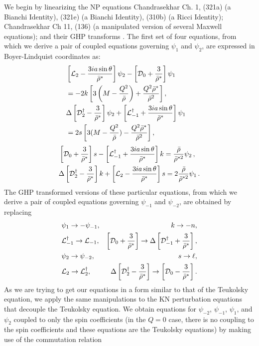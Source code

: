 \begin{refsection}
We begin by linearizing the NP equations Chandrasekhar Ch. 1, (321a) (a Bianchi Identity), (321e) (a Bianchi Identity),  (310b) (a Ricci Identity); Chandrasekhar Ch 11, (136) (a manipulated version of several Maxwell equations); and their GHP transforms \cite{GHP}. The first set of four equations, from which we derive a pair of coupled equations governing $\psi_1$ and $\psi_2$, are expressed in Boyer-Lindquist coordinates as:
\begin{align}
&\left[\mathcal{L}_2-\frac{3ia\sin\theta}{\bar{\rho}^*} \right]\psi_2 -\left[\mathcal{D}_0+\frac{3}{\bar{\rho}^*}\right]\psi_1& \nonumber \\
& =-2k\left[3\left(M-\frac{Q^2}{\bar{\rho}}\right)+\frac{Q^2\bar{\rho}^*}{\bar{\rho}^2}\right],& \label{j1}
\\ &\Delta\left[\mathcal{D}_2^\dagger-\frac{3}{\bar{\rho}^*}\right]\psi_2+\left[\mathcal{L}_{-1}^\dagger+\frac{3ia\sin\theta}{\bar{\rho}^*}\right]\psi_1& \nonumber \\
&=2s\left[3(M-\frac{Q^2}{\bar{\rho}})-\frac{Q^2\bar{\rho}^*}{\bar{\rho}^2}\right],& \label{j2}
\end{align}
\begin{align}
&\left[\mathcal{D}_0+\frac{3}{\bar{\rho}^*}\right]s-\left[\mathcal{L}_{-1}^\dagger+\frac{3ia\sin\theta}{\bar{\rho}^*}\right]k=\frac{\bar{\rho}}{\bar{\rho}^{*2}}\psi_2 \,, \label{j3}
\\ &\Delta\left[\mathcal{D}_2^\dagger-\frac{3}{\bar{\rho}^*}\right]k+\left[\mathcal{L}_2-\frac{3ia\sin\theta}{\bar{\rho}^*}\right]s=2\frac{\bar{\rho}}{\bar{\rho}^{*2}}\psi_1 \,. \label{j4}
\end{align}
The GHP transformed versions of these particular equations, from which we derive a pair of coupled equations governing  $\psi_{-1}$ and $\psi_{-2}$, are obtained by replacing 
\begin{align}
&\psi_1 \to -\psi_{-1}, &k \to -n, \nonumber 
\\& \mathcal{L}_{-1}^\dagger \to \mathcal{L}_{-1}, & \left[ \mathcal{D}_0 +\frac{3}{\bar \rho^*}\right] \to \Delta \left[ \mathcal{D}_{-1}^\dagger +\frac{3}{\bar \rho^*}\right], \nonumber
\\ & \psi_2 \to \psi_{-2}, & s \to \ell, \nonumber \\
&\mathcal{L}_2 \to \mathcal{L}_2^\dagger, & \Delta\left[\mathcal{D}_2^\dagger -\frac{3}{\bar \rho^*}\right] \to \left[\mathcal{D}_0 -\frac{3}{\bar \rho^*}\right]. \nonumber
\end{align}
As we are trying to get our equations in a form similar to that of the Teukolsky equation, we apply the same manipulations to the KN perturbation equations that decouple the Teukolsky equation. We obtain equations for $\psi_{-2}$, $\psi_{-1}$, $\psi_1$, and $\psi_2$ coupled to only the spin coefficients (in the $Q=0$ case, there is no coupling to the spin coefficients and these equations are the Teukolsky equations) by making use of the commutation relation

\end{refsection}
